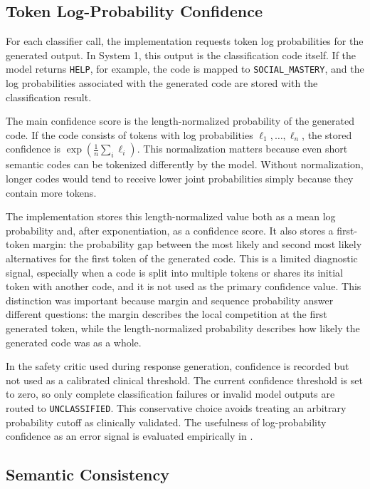 \subsection{Token Log-Probability Confidence}

For each classifier call, the implementation requests token log probabilities for the
generated output. In System 1, this output is the classification code itself. If the model
returns \texttt{HELP}, for example, the code is mapped to
\texttt{SOCIAL\_MASTERY}, and the log probabilities associated with the generated
code are stored with the classification result.

The main confidence score is the length-normalized probability of the generated code.
If the code consists of tokens with log probabilities
\(\ell_1, \ldots, \ell_n\), the stored confidence is
\(\exp(\frac{1}{n}\sum_i \ell_i)\). This normalization matters because even short
semantic codes can be tokenized differently by the model. Without normalization,
longer codes would tend to receive lower joint probabilities simply because they contain
more tokens.

The implementation stores this length-normalized value both as a mean log probability
and, after exponentiation, as a confidence score. It also stores a first-token margin:
the probability gap between the most likely and second most likely alternatives for the
first token of the generated code. This is a limited diagnostic signal, especially when a
code is split into multiple tokens or shares its initial token with another code, and it is
not used as the primary confidence value. This distinction was important because margin
and sequence probability answer different questions: the margin describes the local
competition at the first generated token, while the length-normalized probability
describes how likely the generated code was as a whole.

In the safety critic used during response generation, confidence is recorded but not
used as a calibrated clinical threshold. The current confidence threshold is set to zero,
so only complete classification failures or invalid model outputs are routed to
\texttt{UNCLASSIFIED}. This conservative choice avoids treating an arbitrary probability
cutoff as clinically validated. The usefulness of log-probability confidence as an error
signal is evaluated empirically in .

\subsection{Semantic Consistency}

